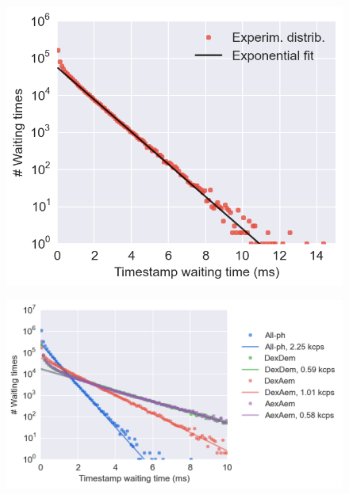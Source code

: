 \begin{figure}
\begin{center}
\includegraphics[width=\singlefig]{"figures/ph_delays_distrib1/ph_delays_distrib1"}
\caption[]{}
\end{center}
\end{figure}

\begin{figure}
\begin{center}
\includegraphics[width=1.2\singlefig]{"figures/ph_delays_distrib_all/ph_delays_distrib_all"}
\caption[]{}
\end{center}
\end{figure}

